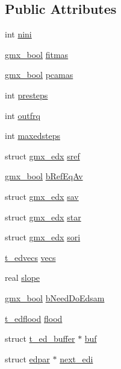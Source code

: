 \subsection*{\-Public \-Attributes}
\begin{DoxyCompactItemize}
\item 
int \hyperlink{structedpar_aef2b0754d0c74e6c720539180d120429}{nini}
\item 
\hyperlink{include_2types_2simple_8h_a8fddad319f226e856400d190198d5151}{gmx\-\_\-bool} \hyperlink{structedpar_a8cc343f0bb713e555313cd0a236dad7a}{fitmas}
\item 
\hyperlink{include_2types_2simple_8h_a8fddad319f226e856400d190198d5151}{gmx\-\_\-bool} \hyperlink{structedpar_addf7e932fb133b6458820762be63abcb}{pcamas}
\item 
int \hyperlink{structedpar_a7c2005242385e55be2c31c3c24ff35ea}{presteps}
\item 
int \hyperlink{structedpar_ab7f814445469c4697e38f59f63f48c47}{outfrq}
\item 
int \hyperlink{structedpar_a35235bf4f2b5347417f3ee3a1b89a97f}{maxedsteps}
\item 
struct \hyperlink{structgmx__edx}{gmx\-\_\-edx} \hyperlink{structedpar_ad1dfcfadcc51c16ad5972735f90b78f9}{sref}
\item 
\hyperlink{include_2types_2simple_8h_a8fddad319f226e856400d190198d5151}{gmx\-\_\-bool} \hyperlink{structedpar_a7ce771f9c278bd85aeb3739171f59dda}{b\-Ref\-Eq\-Av}
\item 
struct \hyperlink{structgmx__edx}{gmx\-\_\-edx} \hyperlink{structedpar_a09222fd5a1c8c4b67ed0099f1892765a}{sav}
\item 
struct \hyperlink{structgmx__edx}{gmx\-\_\-edx} \hyperlink{structedpar_a0c00587026e89bcae770953f1453f4c1}{star}
\item 
struct \hyperlink{structgmx__edx}{gmx\-\_\-edx} \hyperlink{structedpar_ae46e44e563149785fc8b79dfe253574b}{sori}
\item 
\hyperlink{structt__edvecs}{t\-\_\-edvecs} \hyperlink{structedpar_a5d91b78081aa45028af7624d609c5980}{vecs}
\item 
real \hyperlink{structedpar_ad43ae47e3428cee1eb8dad52d2459645}{slope}
\item 
\hyperlink{include_2types_2simple_8h_a8fddad319f226e856400d190198d5151}{gmx\-\_\-bool} \hyperlink{structedpar_a52e32c80804e39f36cf59ed974f2031d}{b\-Need\-Do\-Edsam}
\item 
\hyperlink{structt__edflood}{t\-\_\-edflood} \hyperlink{structedpar_a6e206b87c9526d40497901bf6b767bdd}{flood}
\item 
struct \hyperlink{structt__ed__buffer}{t\-\_\-ed\-\_\-buffer} $\ast$ \hyperlink{structedpar_a884a1cb25ba96e88062a16344933d31a}{buf}
\item 
struct \hyperlink{structedpar}{edpar} $\ast$ \hyperlink{structedpar_abb030b5ec16018368629644593d7d910}{next\-\_\-edi}
\end{DoxyCompactItemize}


